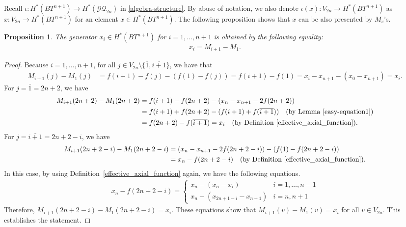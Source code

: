 \documentclass[12pt]{amsart}
\newtheorem{proposition}[theorem]{Proposition}
\theoremstyle{remark}
\numberwithin{equation}{section}
\begin{document}
Recall $\iota:H^{*}(BT^{n+1})\to H^{*}(\mathcal{GQ}_{2n})$ in \eqref{algebra-structure}. 
By abuse of notation, we also denote $\iota(x):V_{2n}\to H^{*}(BT^{n+1})$ as $x:V_{2n}\to H^{*}(BT^{n+1})$ for an element $x\in H^{*}(BT^{n+1})$.
The following proposition shows that $x$ can be also presented by $M_{v}$'s. 
\begin{proposition}
\label{polynomial generators}
The generator $x_{i}\in H^{*}(BT^{n+1})$ for $i=1,\ldots, n+1$ is obtained by the following equality: 
\begin{align*}
x_{i}=M_{i+1}-M_{1}.
\end{align*}
\end{proposition}
\begin{proof}
Because $i=1,\ldots, n+1$, for all $j\in V_{2n}\setminus\{\overline{1}, \overline{i+1}\}$, we have that 
\begin{align*}
M_{i+1}(j)-M_{1}(j)&=f(i+1)-f(j)-(f(1)-f(j))=f(i+1)-f(1)=x_{i}-x_{n+1}-(x_{0}-x_{n+1})=x_{i}.
\end{align*}
For $j=\overline{1}=2n+2$, we have 
\begin{align*}
M_{i+1}(2n+2)-M_{1}(2n+2)&=f(i+1)-f(2n+2)-(x_{n}-x_{n+1}-2f(2n+2)) \\
&=f(i+1)+f(2n+2)-(f(i+1)+f(\overline{i+1}))\quad ({\rm by\ Lemma~\ref{easy-equation1}}) \\
&=f(2n+2)-f(\overline{i+1})=x_{i} \quad ({\rm by\ Definition~\ref{effective_axial_function}}).
\end{align*}
For $j=\overline{i+1}=2n+2-i$, we have 
\begin{align*}
M_{i+1}(2n+2-i)-M_{1}(2n+2-i)&=(x_{n}-x_{n+1}-2f(2n+2-i))-(f(1)-f(2n+2-i)) \\
&=x_{n}-f(2n+2-i) \quad ({\rm by\ Definition~\ref{effective_axial_function}}).
\end{align*}
In this case, by using Definition~\ref{effective_axial_function} again, we have the following equations.
\begin{align*}
x_{n}-f(2n+2-i) =
\left\{
\begin{array}{ll}
x_{n}-(x_{n}-x_{i}) & i=1,\ldots, n-1 \\
x_{n}-(x_{2n+1-i}-x_{n+1}) & i=n,n+1 
\end{array}
\right.
\end{align*}
Therefore, $M_{i+1}(2n+2-i)-M_{1}(2n+2-i)=x_{i}$.
These equations show that 
$M_{i+1}(v)-M_{1}(v)=x_{i}$
for all $v\in V_{2n}$.
This establishes the statement. 
\end{proof}
\end{document}
